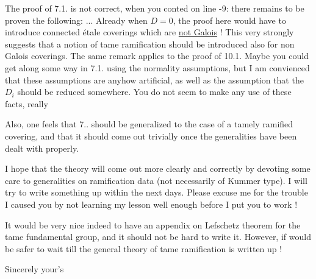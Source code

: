 The proof of 7.1. is not correct, when you conted on line -9: there remains to be proven the following: ... Already when $D=0$, the proof here would have to introduce connected étale coverings which are \uline{not Galois} ! This very strongly suggests that a notion of tame ramification should be introduced also  for non Galois coverings. The same remark applies to the proof of 10.1. Maybe you could get along some way in 7.1. using the normality assumptions, but I am convienced that these assumptions are anyhow artificial, as well as the assumption that the $D_i$ should be reduced somewhere. You do not seem to make any use of these facts, really

Also, one feels that 7.. should be generalized to the case of a tamely ramified covering, and that it should come out trivially once the generalities have been dealt with properly.

I hope that the theory will come out more clearly and correctly by devoting some care to generalities on ramification data (not necessarily of Kummer type). I will try to write something up within the next days. Please excuse me for the trouble I caused you by not learning my lesson well enough before I put you to work !

It would be very nice indeed to have an appendix on Lefschetz theorem for the tame fundamental group, and it should not be hard to write it. However, if would be safer to wait till the general theory of tame ramification is written up !

Sincerely your's\\
